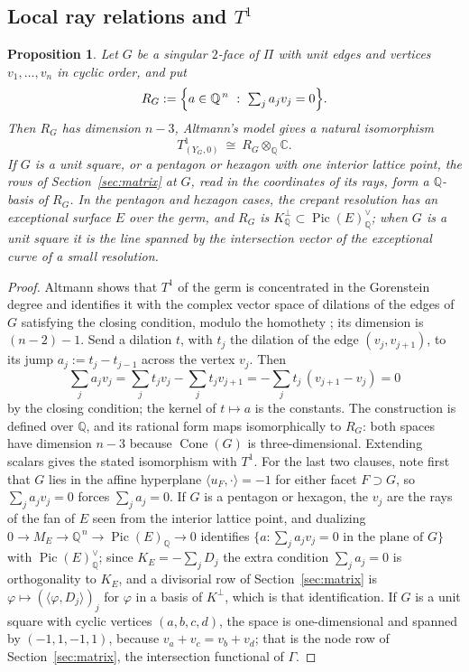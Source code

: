 \documentclass[11pt]{amsart}
\newtheorem{proposition}[theorem]{Proposition}
\theoremstyle{definition}
\theoremstyle{remark}
\theoremstyle{plain}
\newcommand{\QQ}{\mathbb{Q}}
\newcommand{\CC}{\mathbb{C}}
\newcommand{\Cone}{\operatorname{Cone}}
\newcommand{\Pic}{\operatorname{Pic}}
\begin{document}
\subsection{Local ray relations and \texorpdfstring{$T^1$}{T1}}
\label{sec:channelsT1}

\begin{proposition}\label{prop:T1channels}
Let $G$ be a singular $2$-face of $\Pi$ with unit edges and vertices
$v_1,\dots,v_n$ in cyclic order, and put
\[
R_G:=\Bigl\{a\in\QQ^{\,n}\ :\ \textstyle\sum_j a_jv_j=0\Bigr\}.
\]
Then $R_G$ has dimension $n-3$, Altmann's model gives a natural isomorphism
\[
T^1_{(Y_G,0)}\ \cong\ R_G\otimes_{\QQ}\CC.
\]
If $G$ is a unit square, or a pentagon or hexagon with one interior
lattice point, the rows of Section~\ref{sec:matrix} at $G$, read in the
coordinates of its rays, form a $\QQ$-basis of $R_G$.
In the pentagon and hexagon cases, the crepant resolution has an
exceptional surface $E$ over the germ, and $R_G$ is
$K^{\perp}_{\QQ}\subset\Pic(E)^{\vee}_{\QQ}$; when $G$ is a unit square it is
the line spanned by the intersection vector of the exceptional curve of a
small resolution.
\end{proposition}

\begin{proof}
Altmann shows that $T^1$ of the germ is concentrated in the Gorenstein
degree \cite[(6.5) and the subsequent Remark]{Altmann95} and identifies it
with the complex vector space of dilations of the edges of $G$ satisfying the
closing condition, modulo the homothety \cite[(2.2), (2.6)]{Altmann97}; its
dimension is $(n-2)-1$.  Send a dilation $t$, with $t_j$ the dilation of the edge
$(v_j,v_{j+1})$, to its jump $a_j:=t_j-t_{j-1}$ across the vertex $v_j$.
Then
\[
\sum_j a_jv_j=\sum_j t_jv_j-\sum_j t_jv_{j+1}
=-\sum_j t_j\,(v_{j+1}-v_j)=0
\]
by the closing condition; the kernel of $t\mapsto a$ is the constants.
The construction is defined over $\QQ$, and its rational form maps
isomorphically to $R_G$: both spaces have dimension $n-3$ because
$\Cone(G)$ is three-dimensional.  Extending scalars gives the stated
isomorphism with $T^1$.  For the last two clauses, note first that $G$ lies in
the affine hyperplane $\langle u_F,\cdot\rangle=-1$ for either facet
$F\supset G$, so $\sum_ja_jv_j=0$ forces $\sum_ja_j=0$.  If $G$ is a
pentagon or hexagon, the $v_j$ are the rays of the fan of $E$ seen from
the interior lattice point, and dualizing
$0\to M_E\to\QQ^{\,n}\to\Pic(E)_{\QQ}\to0$ identifies
$\{a:\sum_ja_jv_j=0\text{ in the plane of }G\}$ with
$\Pic(E)^{\vee}_{\QQ}$; since $K_E=-\sum_jD_j$ the extra condition
$\sum_ja_j=0$ is orthogonality to $K_E$, and a divisorial row of
Section~\ref{sec:matrix} is $\varphi\mapsto(\langle\varphi,D_j\rangle)_j$
for $\varphi$ in a basis of $K^{\perp}$, which is that identification.
If $G$ is a unit square with cyclic vertices $(a,b,c,d)$, the space is
one-dimensional and spanned by $(-1,1,-1,1)$, because
$v_a+v_c=v_b+v_d$; that is the node row of Section~\ref{sec:matrix}, the
intersection functional of $\Gamma$.
\end{proof}
\end{document}
